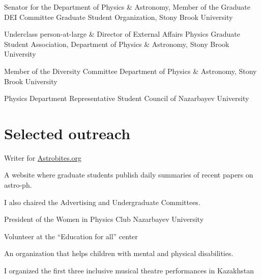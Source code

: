 \documentclass[10pt]{article} %
\begin{document}
\begin{paracol}{1}

	

	{Senator for the Department of Physics \& Astronomy, Member of the Graduate DEI Committee}
	{Graduate Student Organization, Stony Brook University}
	
	{Underclass person-at-large \& Director of External Affairs}
	{Physics Graduate Student Association, Department of Physics \& Astronomy, Stony Brook University}
	
	{Member of the Diversity Committee}
	{Department of Physics \& Astronomy, Stony Brook University}
	
	{Physics Department Representative}
	{Student Council of Nazarbayev University}
	
\section{Selected outreach}
	{Writer for \href{https://astrobites.org/author/ssagynbayeva/}{Astrobites.org}}
	{A website where graduate students publish daily summaries of recent papers on astro-ph.
	
	I also chaired the Advertising and Undergraduate Committees.}

	
	
	
	{President of the Women in Physics Club}
	{Nazarbayev University}
	

	{Volunteer at the “Education for all” center}
	{An organization that helps children with mental and physical disabilities. 
	
	I organized the first three inclusive musical theatre performances in Kazakhstan}
	
	



\end{paracol}
\end{document}
